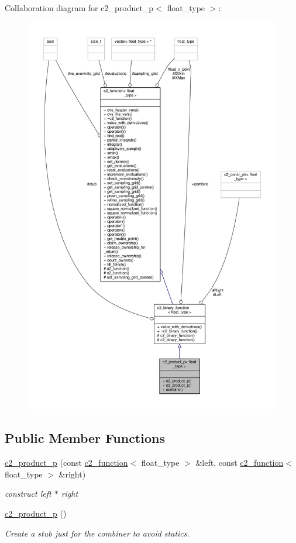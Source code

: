 Collaboration diagram for c2\+\_\+product\+\_\+p$<$ float\+\_\+type $>$\+:
\nopagebreak
\begin{figure}[H]
\begin{center}
\leavevmode
\includegraphics[width=350pt]{classc2__product__p__coll__graph}
\end{center}
\end{figure}
\subsection*{Public Member Functions}
\begin{DoxyCompactItemize}
\item 
\hyperlink{classc2__product__p_af39b700c5114f8e7fc46f12d23125fd8}{c2\+\_\+product\+\_\+p} (const \hyperlink{classc2__function}{c2\+\_\+function}$<$ float\+\_\+type $>$ \&left, const \hyperlink{classc2__function}{c2\+\_\+function}$<$ float\+\_\+type $>$ \&right)
\begin{DoxyCompactList}\small\item\em construct {\itshape left} $\ast$ {\itshape right} \end{DoxyCompactList}\item 
\hyperlink{classc2__product__p_a82b8eb1b1621b07a6a02ce38f3c2f40e}{c2\+\_\+product\+\_\+p} ()
\begin{DoxyCompactList}\small\item\em Create a stub just for the combiner to avoid statics. \end{DoxyCompactList}\end{DoxyCompactItemize}
